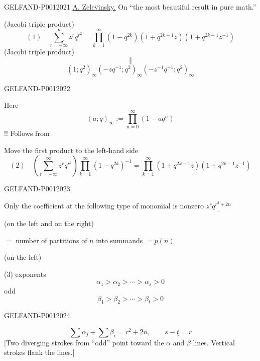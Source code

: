 \begin{GelfandAdjacentEvidence}{GELFAND-P001202}{1}
\underline{A. Zelevinsky.} On “the most beautiful result in pure math.”

(Jacobi triple product)
\[
(1)\quad
\sum_{r=-\infty}^{\infty}z^r q^{r^2}
=\prod_{k=1}^{\infty}(1-q^{2k})(1+q^{2k-1}z)(1+q^{2k-1}z^{-1})
\]
(Jacobi triple product)
\[
\Vert
\]
\[
(1;q^2)_\infty(-zq^{-1};q^2)_\infty(-z^{-1}q^{-1};q^2)_\infty
\]
\end{GelfandAdjacentEvidence}
\begin{GelfandAdjacentEvidence}{GELFAND-P001202}{2}


Here
\[
(a;q)_\infty:=\prod_{n=0}^{\infty}(1-aq^n)
\]
!! Follows from 


Move the first product to the left-hand side
\[
(2)\quad
\left(\sum_{r=-\infty}^{\infty}z^r q^{r^2}\right)
\prod_{k=1}^{\infty}(1-q^{2k})^{-1}
=\prod_{k=1}^{\infty}(1+q^{2k-1}z)(1+q^{2k-1}z^{-1})
\]
\end{GelfandAdjacentEvidence}
\begin{GelfandAdjacentEvidence}{GELFAND-P001202}{3}


Only the coefficient at the following type of monomial is nonzero $\underline{z^r q^{r^2+2n}}$

(on the left and on the right)

$={}$ number of partitions of $n$ into summands $=p(n)$

(on the left)

(3)  exponents
\[
\alpha_1>\alpha_2>\cdots>\alpha_s>0
\]
odd
\[
\beta_1>\beta_2>\cdots>\beta_t>0
\]
\end{GelfandAdjacentEvidence}
\begin{GelfandAdjacentEvidence}{GELFAND-P001202}{4}

\[
\sum\alpha_j+\sum\beta_i=r^2+2n,\qquad \underline{\underline{s-t=r}}
\]
[Two diverging strokes from “odd” point toward the $\alpha$ and $\beta$ lines. Vertical strokes flank the lines.]

\end{GelfandAdjacentEvidence}
